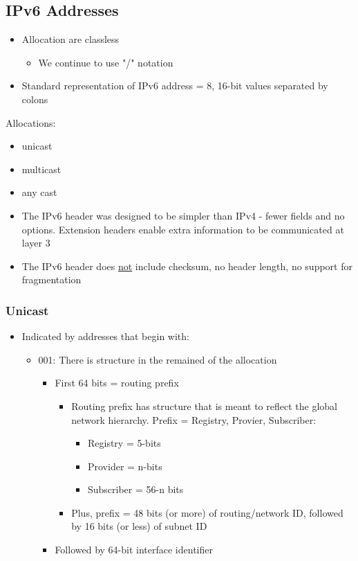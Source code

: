 \documentclass[11pt]{article}
\begin{document}
\subsection{IPv6 Addresses}
\label{sec:orgheadline111}
\begin{itemize}
\item Allocation are classless
\begin{itemize}
\item We continue to use "/" notation
\end{itemize}
\item Standard representation of IPv6 address = 8, 16-bit values separated
by colons
\end{itemize}
Allocations:
\begin{itemize}
\item unicast
\item multicast
\item any cast

\item The IPv6 header was designed to be simpler than IPv4 - fewer fields
and no options. Extension headers enable extra information to be
communicated at layer 3
\item The IPv6 header does \uline{not} include checksum, no header length, no
support for fragmentation
\end{itemize}

\subsubsection{Unicast}
\label{sec:orgheadline110}
\begin{itemize}
\item Indicated by addresses that begin with:
\begin{itemize}
\item 001: There is structure in the remained of the allocation
\begin{itemize}
\item First 64 bits = routing prefix
\begin{itemize}
\item Routing prefix has structure that is meant to reflect the
global network hierarchy. Prefix = Registry, Provier,
Subscriber:
\begin{itemize}
\item Registry = 5-bits
\item Provider = n-bits
\item Subscriber = 56-n bits
\end{itemize}
\item Plus, prefix = 48 bits (or more) of routing/network ID,
followed by 16 bits (or less) of subnet ID
\end{itemize}
\item Followed by 64-bit interface identifier
\end{itemize}
\end{itemize}
\end{itemize}
\end{document}
